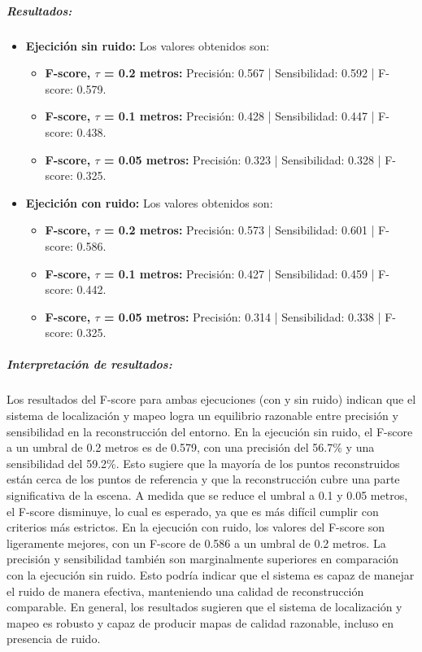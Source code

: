 \documentclass[12pt, a4paper, twoside]{article}
\begin{document}
\subparagraph{Resultados:}
\begin{itemize}
  \item \textbf{Ejecición sin ruido:} Los valores obtenidos son:
  \begin{itemize}
    \item \textbf{F-score\cite{Caccia2018FScore}, \(\tau\) = 0.2 metros:} Precisión: 0.567 | Sensibilidad: 0.592 | F-score\cite{Caccia2018FScore}: 0.579.
    \item \textbf{F-score\cite{Caccia2018FScore}, \(\tau\) = 0.1 metros:} Precisión: 0.428 | Sensibilidad: 0.447 | F-score\cite{Caccia2018FScore}: 0.438.
    \item \textbf{F-score\cite{Caccia2018FScore}, \(\tau\) = 0.05 metros:} Precisión: 0.323 | Sensibilidad: 0.328 | F-score\cite{Caccia2018FScore}: 0.325.
  \end{itemize}
  \item \textbf{Ejecición con ruido:} Los valores obtenidos son:
  \begin{itemize}
    \item \textbf{F-score\cite{Caccia2018FScore}, \(\tau\) = 0.2 metros:} Precisión: 0.573 | Sensibilidad: 0.601 | F-score\cite{Caccia2018FScore}: 0.586.
    \item \textbf{F-score\cite{Caccia2018FScore}, \(\tau\) = 0.1 metros:} Precisión: 0.427 | Sensibilidad: 0.459 | F-score\cite{Caccia2018FScore}: 0.442.
    \item \textbf{F-score\cite{Caccia2018FScore}, \(\tau\) = 0.05 metros:} Precisión: 0.314 | Sensibilidad: 0.338 | F-score\cite{Caccia2018FScore}: 0.325.
  \end{itemize}
\end{itemize}
\subparagraph{Interpretación de resultados:}
Los resultados del F-score\cite{Caccia2018FScore} para ambas ejecuciones (con y sin ruido) indican que el sistema de localización y mapeo logra un equilibrio razonable entre precisión y sensibilidad en la reconstrucción
del entorno.\newline
En la ejecución sin ruido, el F-score\cite{Caccia2018FScore} a un umbral de 0.2 metros es de 0.579, con una precisión del 56.7\% y una sensibilidad del 59.2\%. Esto sugiere que la mayoría de los puntos reconstruidos están
cerca de los puntos de referencia y que la reconstrucción cubre una parte significativa de la escena.
A medida que se reduce el umbral a 0.1 y 0.05 metros, el F-score\cite{Caccia2018FScore} disminuye, lo cual es esperado, ya que es más difícil cumplir con criterios más estrictos.\newline
En la ejecución con ruido, los valores del F-score\cite{Caccia2018FScore} son ligeramente mejores, con un F-score\cite{Caccia2018FScore} de 0.586 a un umbral de 0.2 metros. La precisión y sensibilidad también son marginalmente superiores en 
comparación con la ejecución sin ruido.
Esto podría indicar que el sistema es capaz de manejar el ruido de manera efectiva, manteniendo una calidad de reconstrucción comparable.\newline
En general, los resultados sugieren que el sistema de localización y mapeo es robusto y capaz de producir mapas de calidad razonable, incluso en presencia de ruido.
\end{document}

